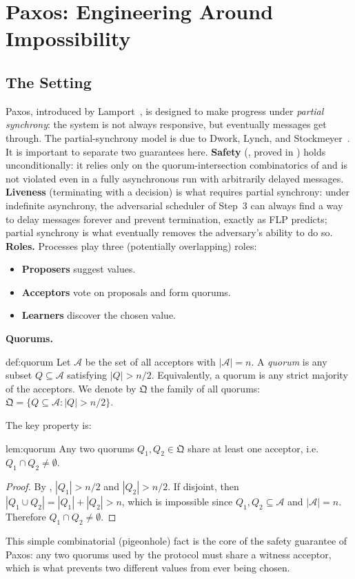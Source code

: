 \section{Paxos: Engineering Around Impossibility}\label{sec:paxos}
\subsection{The Setting}
Paxos, introduced by Lamport~\cite{lamport1998}, is designed to make progress under \emph{partial synchrony}: the system is not always responsive, but eventually messages get through. The partial-synchrony model is due to Dwork, Lynch, and Stockmeyer~\cite{dworkls1988}. It is important to separate two guarantees here. \textbf{Safety} (, proved in ) holds unconditionally: it relies only on the quorum-intersection combinatorics of  and is not violated even in a fully asynchronous run with arbitrarily delayed messages. \textbf{Liveness} (terminating with a decision) is what requires partial synchrony: under indefinite asynchrony, the adversarial scheduler of Step~3 can always find a way to delay messages forever and prevent termination, exactly as FLP predicts; partial synchrony is what eventually removes the adversary's ability to do so.
\\[1pt]
\textbf{Roles.} Processes play three (potentially overlapping) roles:\\[-0.7cm]
\begin{itemize}[nosep]
    \item \textbf{Proposers} suggest values.
    \item \textbf{Acceptors} vote on proposals and form quorums.
    \item \textbf{Learners} discover the chosen value.
\end{itemize}
\textbf{Quorums.}
\begin{smjdefinition}[Quorum]{def:quorum}
Let $\mathcal{A}$ be the set of all acceptors with $|\mathcal{A}| = n$. A \emph{quorum} is any subset $Q \subseteq \mathcal{A}$ satisfying $|Q| > n/2$. Equivalently, a quorum is any strict majority of the acceptors. We denote by $\mathfrak{Q}$ the family of all quorums: $\mathfrak{Q} = \{Q \subseteq \mathcal{A} : |Q| > n/2\}$.
\end{smjdefinition}
The key property is:
\begin{smjlemma}{lem:quorum}
Any two quorums $Q_1, Q_2 \in \mathfrak{Q}$ share at least one acceptor, i.e.\ $Q_1 \cap Q_2 \neq \emptyset$.
\end{smjlemma}
\vspace{-0.3cm}
\begin{proof}
By , $|Q_1| > n/2$ and $|Q_2| > n/2$. If disjoint, then $|Q_1 \cup Q_2| = |Q_1| + |Q_2| > n$, which is impossible since $Q_1, Q_2 \subseteq \mathcal{A}$ and $|\mathcal{A}| = n$. Therefore $Q_1 \cap Q_2 \neq \emptyset$.
\end{proof}
\vspace{-0.3cm}
This simple combinatorial (pigeonhole) fact is the core of the safety guarantee of Paxos: any two quorums used by the protocol must share a witness acceptor, which is what prevents two different values from ever being chosen.
\vspace{-0.3cm}

